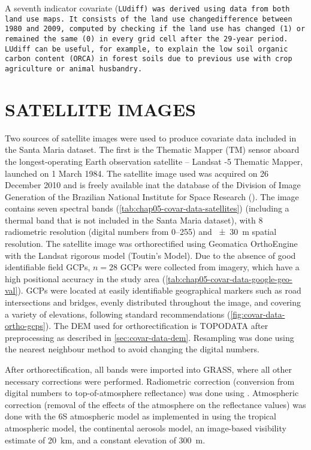 A seventh indicator covariate (\tt{LUdiff}) was derived using data from both land use maps. It consists of the 
land use changedifference between \num{1980} and \num{2009}, computed by checking if the land use has changed 
(1) or 
remained the same (0) in every grid cell after the 29-year period. \tt{LUdiff} can be useful, for example, to 
explain the low soil organic carbon content (\tt{ORCA}) in forest soils due to previous use with crop 
agriculture or animal husbandry.

\section{SATELLITE IMAGES}
\label{sec:covar-data-sat-image}

Two sources of satellite images were used to produce covariate data included in the Santa Maria dataset. The 
first is the Thematic Mapper (TM) sensor aboard the longest-operating Earth observation satellite -- Landsat -5 
Thematic Mapper, launched on \num{1} 
March \num{1984}. The satellite image used was acquired on \num{26} December \num{2010} and is freely available 
inat 
the database of the Division of Image Generation of the Brazilian National Institute for Space Research 
(\inpedgi). The 
image contains seven spectral bands (\autoref{tab:chap05-covar-data-satellites}) (including a thermal band that 
is 
not included in the Santa Maria dataset), with \SI{8}{\bit} radiometric resolution (digital numbers from 
\numrange{0}{255}) and \SI{\pm30}{\m} spatial resolution. The satellite image was orthorectified using 
Geomatica\textregistered{} OrthoEngine\textregistered{} with the Landsat rigorous model (Toutin's Model). Due 
to the absence of good identifiable field GCPs, $n = 28$ GCPs were collected from \googleearth{} imagery, which 
have a high 
positional accuracy in the study area (\autoref{tab:chap05-covar-data-google-geo-val}). GCPs were located 
at easily identifiable geographical markers such as road intersections and bridges, evenly distributed 
throughout the image, and covering a variety of elevations, following standard recommendations 
\cite{PCIGeomatics2007} (\autoref{fig:covar-data-ortho-gcps}). The DEM used for orthorectification is TOPODATA 
after preprocessing as described in \autoref{sec:covar-data-dem}. Resampling was done using the nearest 
neighbour method to avoid changing the digital numbers.

After orthorectification, all bands were imported into GRASS, where all other necessary corrections were 
performed. Radiometric correction (conversion from digital numbers to top-of-atmosphere reflectance) was done
using . Atmospheric correction (removal of the effects of the atmosphere on the 
reflectance values) was done with the 6S atmospheric model \cite{VermoteEtAl1997} as implemented in 
 using the tropical atmospheric model, the continental aerosols model, an image-based 
visibility estimate of \SI{20}{\km}, and a constant elevation of \SI{300}{\m}.

